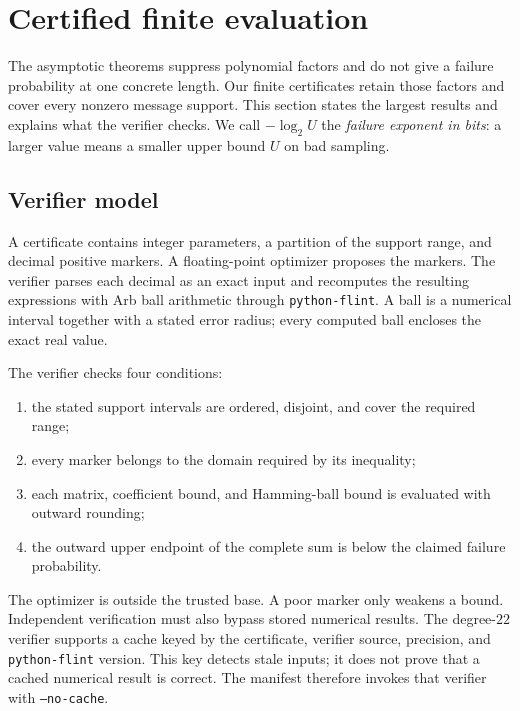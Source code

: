 \section{Certified finite evaluation}
\label{sec:certificates}

The asymptotic theorems suppress polynomial factors and do not give a failure
probability at one concrete length.  Our finite certificates retain those
factors and cover every nonzero message support.  This section states the
largest results and explains what the verifier checks.
We call $-\log_2 U$ the \emph{failure exponent in bits}: a larger value means
a smaller upper bound $U$ on bad sampling.

\subsection{Verifier model}

A certificate contains integer parameters, a partition of the support range,
and decimal positive markers.  A floating-point optimizer proposes the
markers.  The verifier parses each decimal as an exact input and recomputes
the resulting expressions with Arb ball arithmetic through
\texttt{python-flint}.  A ball is a numerical interval together with a stated
error radius; every computed ball encloses the exact real value.

The verifier checks four conditions:

\begin{enumerate}
  \item the stated support intervals are ordered, disjoint, and cover the
  required range;
  \item every marker belongs to the domain required by its inequality;
  \item each matrix, coefficient bound, and Hamming-ball bound is evaluated
  with outward rounding;
  \item the outward upper endpoint of the complete sum is below the claimed
  failure probability.
\end{enumerate}

The optimizer is outside the trusted base.  A poor marker only weakens a
bound.  Independent verification must also bypass stored numerical results.
The degree-$22$ verifier supports a cache keyed by the certificate, verifier
source, precision, and \texttt{python-flint} version.  This key detects stale
inputs; it does not prove that a cached numerical result is correct.
The manifest therefore invokes that verifier with \texttt{--no-cache}.


